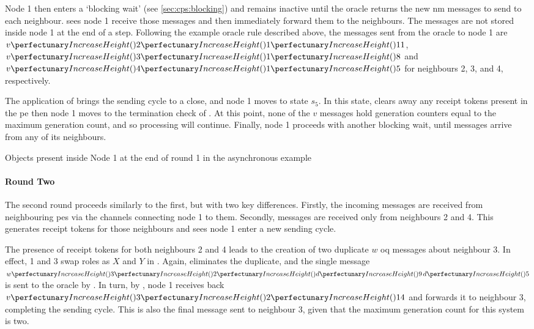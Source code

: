 Node 1 then enters a `blocking wait' (see \cref{sec:cps:blocking}) and remains inactive until the oracle returns the new \gls{nm} messages to send to each neighbour.   sees node 1 receive those messages and then immediately forward them to the neighbours.  The messages are not stored inside node 1 at the end of a step.  Following the example oracle rule described above, the messages sent from the oracle to node 1 are \(\cpvv{2}{1}{11}\), \(\cpvv{3}{1}{8}\) and \(\cpvv{4}{1}{5}\) for neighbours 2, 3, and 4, respectively.

The application of  brings the sending cycle to a close, and node 1 moves to state \(s_5\).  In this state,  clears away any receipt tokens present in the \gls{pe} then node 1 moves to the termination check of .  At this point, none of the \(v\) messages hold generation counters equal to the maximum generation count, and so processing will continue.  Finally, node 1 proceeds with another blocking wait, until messages arrive from any of its neighbours.

\begin{cpobjectsfloat}
\begin{cpobjects}
\end{cpobjects}
\caption{\label{objs:nmp:ex1}Objects present inside Node 1 at the end of round 1 in the asynchronous  example}
\end{cpobjectsfloat}

\paragraph{Round Two}
The second round proceeds similarly to the first, but with two key differences.  Firstly, the incoming messages are received from neighbouring \glspl{pe} via the channels connecting node 1 to them.  Secondly, messages are received only from neighbours 2 and 4.  This generates receipt tokens for those neighbours and sees node 1 enter a new sending cycle.

The presence of receipt tokens for both neighbours 2 and 4 leads to the creation of two duplicate \(w\) \gls{oq} messages about neighbour 3.  In effect, 1 and 3 swap roles as \(X\) and \(Y\) in .  Again,  eliminates the duplicate, and the single message \(\cpvw{3}{2}{\cpfunc{d}{9} \, \cpfunc{d}{5}}\) is sent to the oracle by .  In turn, by , node 1 receives back \(\cpvv{3}{2}{14}\) and forwards it to neighbour 3, completing the sending cycle.  This is also the final message sent to neighbour 3, given that the maximum generation count for this system is two.

